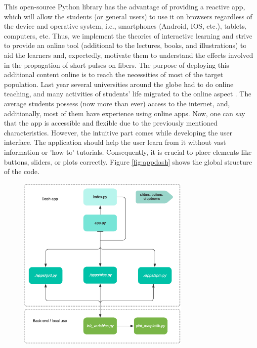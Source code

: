     This open-source Python library has the advantage of providing a reactive app, which will allow the students (or general users) to use it on browsers regardless of the device and operative system, i.e., smartphones (Android, IOS, etc.), tablets, computers, etc. Thus, we implement the theories of interactive learning and strive to provide an online tool (additional to the lectures, books, and illustrations) to aid the learners and, expectedly, motivate them to understand the effects involved in the propagation of short pulses on fibers. 
    The purpose of deploying this additional content online is to reach the necessities of most of the target population. Last year several universities around the globe had to do online teaching, and many activities of students' life migrated to the online aspect \citep{Hassel2020}. The average students possess (now more than ever) access to the internet, and, additionally, most of them have experience using online apps. Now, one can say that the app is accessible and flexible due to the previously mentioned characteristics. However, the intuitive part comes while developing the user interface. The application should help the user learn from it without vast information or 'how-to' tutorials. Consequently, it is crucial to place elements like buttons, sliders, or plots correctly. Figure \ref{fig:appdash} shows the global structure of the code. 
    
    \begin{figure}[label={fig:appdash}, caption={Global structure of the code.}]
        	\includegraphics[trim = 0cm 0.5cm 0 1.2cm, clip, width=0.75\textwidth]{figures/chap3/Apps.eps} 
        \end{figure}
    

